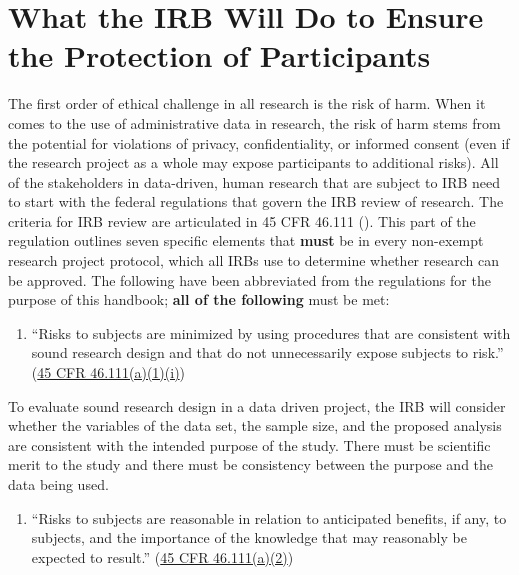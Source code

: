 \hypertarget{what-the-irb-will-do-to-ensure-the-protection-of-participants}{%
\section{What the IRB Will Do to Ensure the Protection of Participants}\label{what-the-irb-will-do-to-ensure-the-protection-of-participants}}

The first order of ethical challenge in all research is the risk of harm. When it comes to the use of administrative data in research, the risk of harm stems from the potential for violations of privacy, confidentiality, or informed consent (even if the research project as a whole may expose participants to additional risks). All of the stakeholders in data-driven, human research that are subject to IRB need to start with the federal regulations that govern the IRB review of research. The criteria for IRB review are articulated in 45 CFR 46.111 (\citet{codeoffederalregulations2017}). This part of the regulation outlines seven specific elements that \textbf{must} be in every non-exempt research project protocol, which all IRBs use to determine whether research can be approved. The following have been abbreviated from the regulations for the purpose of this handbook; \textbf{all of the following} must be met:

\begin{enumerate}
\def\labelenumi{(\arabic{enumi})}
\tightlist
\item
  ``Risks to subjects are minimized by using procedures that are consistent with sound research design and that do not unnecessarily expose subjects to risk.'' (\href{https://www.law.cornell.edu/cfr/text/45/46.111}{45 CFR 46.111(a)(1)(i)})
\end{enumerate}

To evaluate sound research design in a data driven project, the IRB will consider whether the variables of the data set, the sample size, and the proposed analysis are consistent with the intended purpose of the study. There must be scientific merit to the study and there must be consistency between the purpose and the data being used.

\begin{enumerate}
\def\labelenumi{(\arabic{enumi})}
\setcounter{enumi}{1}
\tightlist
\item
  ``Risks to subjects are reasonable in relation to anticipated benefits, if any, to subjects, and the importance of the knowledge that may reasonably be expected to result.'' (\href{https://www.law.cornell.edu/cfr/text/45/46.111}{45 CFR 46.111(a)(2)})
\end{enumerate}

